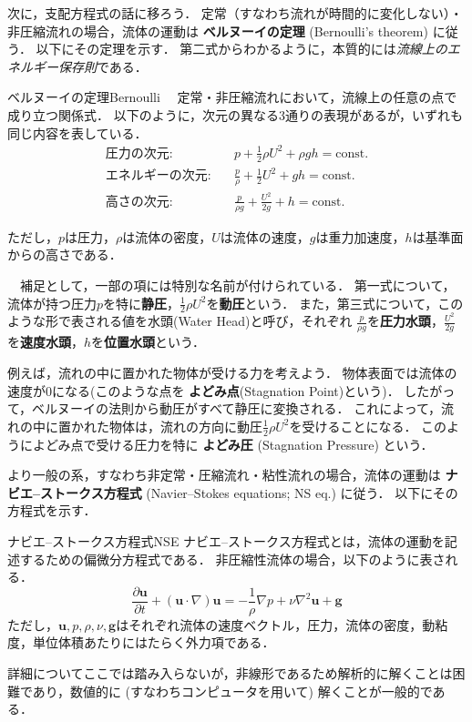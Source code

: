 \documentclass[uplatex,dvipdfmx,a4j,11pt]{jsreport}
\newcommand{\keyword}[1]{\textcolor{mainblue}{\textbf{#1}}}
\numberwithin{equation}{chapter}
\begin{document}
\enskip

次に，支配方程式の話に移ろう．
定常（すなわち流れが時間的に変化しない）・非圧縮流れの場合，流体の運動は \keyword{ベルヌーイの定理} (Bernoulli's theorem) に従う．
以下にその定理を示す．
第二式からわかるように，本質的には\emph{流線上のエネルギー保存則}である．
\begin{definition}{ベルヌーイの定理}{Bernoulli}{}
  　定常・非圧縮流れにおいて，流線上の任意の点で成り立つ関係式．
  以下のように，次元の異なる3通りの表現があるが，いずれも同じ内容を表している．
  \begin{align}
  	\text{圧力の次元}:      &\quad p + \frac{1}{2}\rho U^{2} + \rho g h = \mathrm{const.}\\
  	\text{エネルギーの次元}:&\quad \frac{p}{\rho} + \frac{1}{2} U^{2} + g h = \mathrm{const.}\\
  	\text{高さの次元}:      &\quad \frac{p}{\rho g} + \frac{U^{2}}{2g} + h = \mathrm{const.}
  \end{align}

  ただし，$p$は圧力，$\rho$は流体の密度，$U$は流体の速度，$g$は重力加速度，$h$は基準面からの高さである．

  　補足として，一部の項には特別な名前が付けられている．
  第一式について，流体が持つ圧力$p$を特に\keyword{静圧}，$\frac{1}{2}\rho U^{2}$を\keyword{動圧}という．
  また，第三式について，このような形で表される値を水頭(Water Head)と呼び，それぞれ
  $\frac{p}{\rho g}$を\keyword{圧力水頭}，$\frac{U^{2}}{2g}$を\keyword{速度水頭}，$h$を\keyword{位置水頭}という．
\end{definition}

例えば，流れの中に置かれた物体が受ける力を考えよう．
物体表面では流体の速度が0になる(このような点を \keyword{よどみ点}(Stagnation Point)という)．
したがって，ベルヌーイの法則から動圧がすべて静圧に変換される．
これによって，流れの中に置かれた物体は，流れの方向に動圧$ \frac{1}{2}\rho U^{2} $を受けることになる．
このようによどみ点で受ける圧力を特に \keyword{よどみ圧} (Stagnation Pressure) という．

\enskip

より一般の系，すなわち非定常・圧縮流れ・粘性流れの場合，流体の運動は \keyword{ナビエ--ストークス方程式} (Navier--Stokes equations; NS eq.) に従う．
以下にその方程式を示す．
\begin{definition}{ナビエ--ストークス方程式}{NSE}{}
  ナビエ--ストークス方程式とは，流体の運動を記述するための偏微分方程式である．
  非圧縮性流体の場合，以下のように表される．
    \begin{equation}
    \frac{\partial \mathbf{u}}{\partial t} + (\mathbf{u} \cdot \nabla) \mathbf{u} = -\frac{1}{\rho} \nabla p + \nu \nabla^{2} \mathbf{u} + \mathbf{g}
    \end{equation}
  ただし，$\mathbf{u}, p, \rho, \nu, \mathbf{g}$はそれぞれ流体の速度ベクトル，圧力，流体の密度，動粘度，単位体積あたりにはたらく外力項である．
\end{definition}
詳細についてここでは踏み入らないが，非線形であるため解析的に解くことは困難であり，数値的に (すなわちコンピュータを用いて) 解くことが一般的である．
\end{document}
